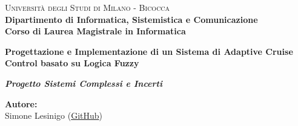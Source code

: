 \begin{titlepage}
    
    \noindent
    \begin{minipage}[t]{0.19\textwidth}
    \end{minipage}
    \hspace{2mm}
    \vspace{3cm}
    \begin{minipage}[t]{0.95\textwidth}
    {
            {\textsc{Università degli Studi di Milano - Bicocca}} \\
            \textbf{Dipartimento di Informatica, Sistemistica e Comunicazione} \\
            \textbf{Corso di Laurea Magistrale in Informatica} \\
            \par
    }
    \end{minipage}
    
\vspace{16mm}

\begin{center}
    \Huge{
        \textbf{Progettazione e Implementazione di un Sistema di Adaptive Cruise Control basato su Logica Fuzzy}                           
    }

    \vspace{12mm}
    
    \LARGE{
        \textbf{
            \textit{Progetto Sistemi Complessi e Incerti}
        }
    }
\end{center}
 
    \vspace{30mm}

    \noindent
    
    \vspace{10mm}

    \begin{flushright}
        {\large \textbf{Autore:}} \\
        \large{Simone Lesinigo} 
        (\href{https://github.com/leso246}{GitHub})
    \end{flushright}

    
\end{titlepage}